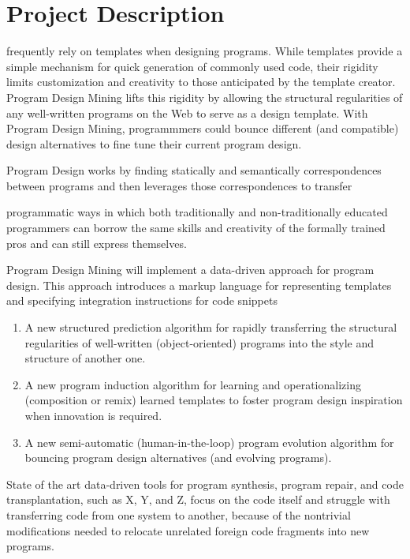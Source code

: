\chapter{Project Description}{}
\label{sec:related}

 frequently rely on templates when designing 
programs. While templates provide a simple mechanism for quick generation of 
commonly used code, their rigidity limits customization and creativity 
to those anticipated by the template creator. Program Design Mining lifts 
this rigidity by allowing the structural regularities of any well-written 
programs on the Web to serve as a design template. With Program Design 
Mining, programmmers could bounce different (and compatible) design 
alternatives to fine tune their current program design. 


Program Design works by 
finding statically and semantically correspondences between programs and then 
leverages those correspondences to transfer


programmatic ways in which both traditionally and 
non-traditionally educated programmers can borrow the same skills and 
creativity of the formally trained pros and can still express themselves.  

Program Design Mining will implement a data-driven approach for 
program design. This approach introduces a markup language for 
representing templates and specifying integration instructions 
for code snippets

\begin{enumerate}
	\item A new structured prediction algorithm for rapidly transferring 
	the structural regularities of well-written (object-oriented) programs 
	into the style and structure of another one.
	\item A new program induction algorithm for learning and operationalizing 
	(composition or remix) learned templates to foster program design 
	inspiration when innovation is required.
	\item A new semi-automatic (human-in-the-loop) program evolution algorithm 
	for bouncing program design alternatives (and evolving programs). 
\end{enumerate}

State of the art data-driven tools for program synthesis, program 
repair, and code transplantation, such as X, Y, and Z, focus 
on the code itself and struggle with transferring code from one system 
to another, because of the nontrivial modifications needed to relocate 
unrelated foreign code fragments into new programs. 

